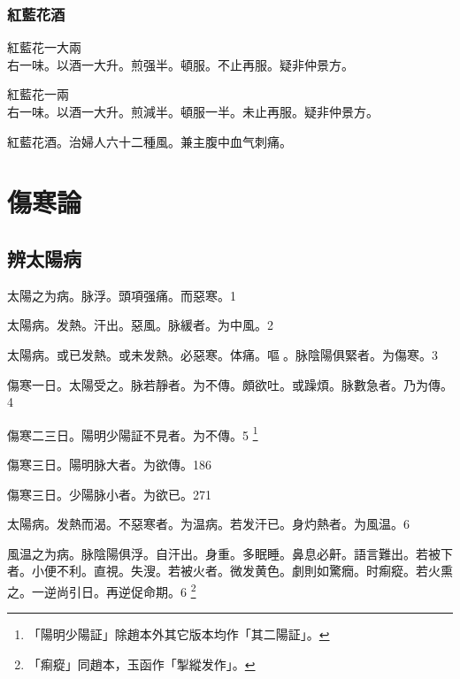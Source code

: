 \section{紅藍花酒}

紅藍花{\scriptsize 一大兩}\\
右一味。以酒一大升。煎强半。頓服。不止再服。{\scriptsize 疑非仲景方。}{\wuben}

紅藍花{\scriptsize 一兩}\\
右一味。以酒一大升。煎減半。頓服一半。未止再服。{\scriptsize 疑非仲景方。}{\dengben}

紅藍花酒。治婦人六十二種風。兼主腹中血气刺痛。

\part{傷寒論}

\chapter{辨太陽病}

太陽之为病。{\khaaitp 脉浮。}頭項强痛。而惡寒。1

太陽病。发熱。汗出。惡風。脉緩者。为中風。2

%

太陽病。或已发熱。或未发熱。必惡寒。体痛。嘔{\sungtpii 𠱘}。脉陰陽俱緊者。为傷寒。3


傷寒一日。太陽受之。脉若靜者。为不傳。頗欲吐。或躁煩。脉數急者。乃为傳。4

傷寒{\khaaitp 二三日}。陽明少陽証不見者。为不傳。5
	\footnote{
		「陽明少陽証」除趙本外其它版本均作「其二陽証」。
	}

傷寒三日。陽明脉大{\khaaitp 者。为欲傳}。186

傷寒三日。少陽脉小者。为欲已。271


太陽病。发熱而渴。不惡寒者。为温病。若发汗已。身灼熱者。为風温。6

風温{\khaaitp 之}为病。脉陰陽俱浮。自汗出。身重。多眠睡。鼻息必鼾。語言難出。若被下者。小便不利。直視。失溲。若被火者。微发黄{\khaaitp 色}。劇則如驚癇。时痸瘲。若火熏之。一逆尚引日。再逆促命期。6
	\footnote{
		「痸瘲」同趙本，玉函作「掣縱发作」。
	}


